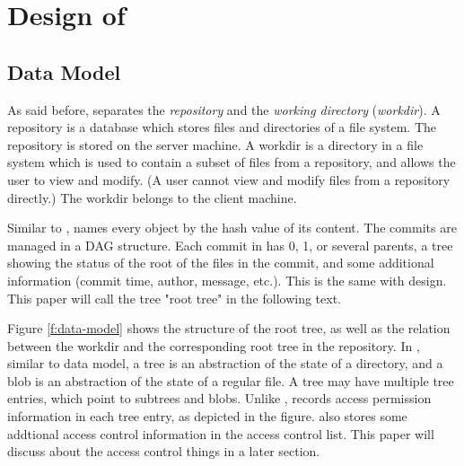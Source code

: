 \section{Design of \sys}
\label{s:design}

%


\subsection{Data Model}
\label{ss:data-model}

As said before, \sys separates the \emph{repository} and the \emph{working
directory} (\emph{workdir}). A repository is a database which stores files
and directories of a file system. The repository is stored on the server
machine. A workdir is a directory in a file system which is used to
contain a subset of files from a repository, and allows the user to view and
modify. (A user cannot view and modify files from a repository directly.) The
workdir belongs to the client machine.

Similar to \git, \sys names every object by the hash value of its content.
The commits are managed in a DAG structure.%
Each commit in \sys has 0, 1, or several parents, a tree showing the status of the root of the files in the commit, and
some additional information (commit time, author, message, etc.). This is the
same with \git design. This paper will call the tree "root tree" in the
following text.



Figure \ref{f:data-model} shows the structure of the root tree, as well as the
relation between the workdir and the corresponding root tree in the repository.
In \sys, similar to \git data model, a tree is an abstraction of the state
of a directory, and a blob is an abstraction of the state of a regular file. A
tree may have multiple tree entries, which point to subtrees and blobs. Unlike
\git, \sys records access permission information in each tree entry, as depicted
in the figure. \sys also stores some addtional access control information in the
access control list. This paper will discuss about the access control things
in a later section.

